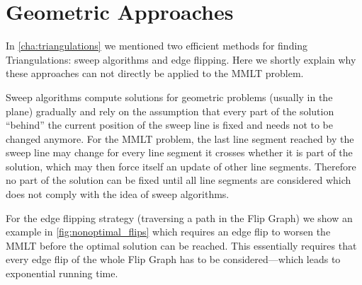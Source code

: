 \section{Geometric Approaches}
In \cref{cha:triangulations} we mentioned two efficient methods for
finding Triangulations: sweep algorithms and edge flipping. Here we
shortly explain why these approaches can not directly be applied to
the \gls{MMLT} problem.

Sweep algorithms compute solutions for geometric problems (usually in
the plane) gradually and rely on the assumption that every part of the
solution ``behind'' the current position of the sweep line is fixed
and needs not to be changed anymore. For the \gls{MMLT} problem, the
last line segment reached by the sweep line may change for every line
segment it crosses whether it is part of the solution, which may then
force itself an update of other line segments. Therefore no part of
the solution can be fixed until all line segments are considered which
does not comply with the idea of sweep algorithms.

For the edge flipping strategy (traversing a path in the Flip Graph)
we show an example in \cref{fig:nonoptimal_flips} which requires an
edge flip to worsen the \gls{MMLT} before the optimal solution can be
reached. This essentially requires that every edge flip of the whole
Flip Graph has to be considered---which leads to exponential running
time.


